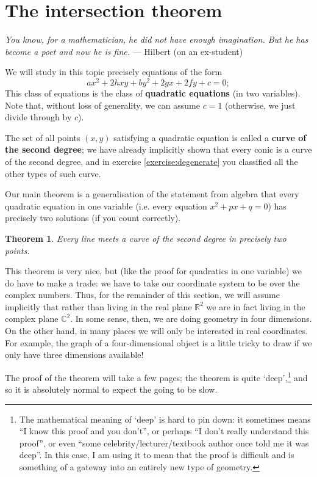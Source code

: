 \documentclass[a4paper,leqno,10pt]{article}
\theoremstyle{exercise}
\theoremstyle{plain}
\newtheorem*{thm}{Theorem}
\theoremstyle{definition}
\theoremstyle{remark}
\newcommand{\df}{\textbf}
\begin{document}
\section{The intersection theorem}
\begin{center}
  \emph{You know, for a mathematician, he did not have enough imagination. But he has become a poet and now he is fine.} --- Hilbert (on an ex-student)
\end{center}
We will study in this topic precisely equations of the form
\begin{equation}\label{eqn:prototype}
  ax^2 + 2hxy + by^2 + 2gx + 2fy + c = 0;
\end{equation}
This class of equations is the class of \df{quadratic equations} (in two variables). Note that, without loss
of generality, we can assume $ c = 1 $ (otherwise, we just divide through by $ c $).

The set of all points $ (x,y) $ satisfying a quadratic equation is called a \df{curve of the second degree}; we
have already implicitly shown that every conic is a curve of the second degree, and in exercise \ref{exercise:degenerate}
you classified all the other types of such curve.

Our main theorem is a generalisation of the statement from algebra that every quadratic equation in one variable
(i.e. every equation $ x^2 + px + q = 0 $) has precisely two solutions (if you count correctly).
\begin{thm}\label{thm:funthmquad}
  Every line meets a curve of the second degree in precisely two points.
\end{thm}

This theorem is very nice, but (like the proof for quadratics in one variable) we do have to make a trade:
we have to take our coordinate system to be over the complex numbers. Thus, for the remainder of this section,
we will assume implicitly that rather than living in the real plane $ \mathbb{R}^2 $ we are in fact living
in the complex plane $ \mathbb{C}^2 $. In some sense, then, we are doing geometry in four dimensions. On the
other hand, in many places we will only be interested in real coordinates. For example, the graph of a four-dimensional
object is a little tricky to draw if we only have three dimensions available!

The proof of the theorem will take a few pages; the theorem is quite `deep',\footnote{The mathematical meaning of `deep' is hard to pin down: it sometimes
means ``I know this proof and you don't'', or perhaps ``I don't really understand this proof'', or even ``some celebrity/lecturer/textbook author once
told me it was deep''. In this case, I am using it to mean that the proof is difficult and is something of a gateway into an entirely new type of geometry.}
and so it is absolutely normal to expect the going to be slow.
\end{document}
